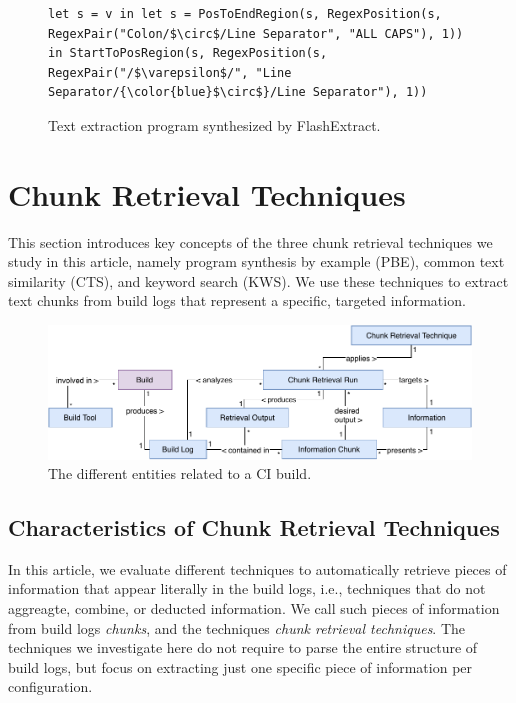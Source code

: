 \begin{figure}[!t]
  \centering
  \begin{lstlisting}[breaklines=true]
let s = v in let s = PosToEndRegion(s, RegexPosition(s, RegexPair("Colon/$\circ$/Line Separator", "ALL CAPS"), 1)) in StartToPosRegion(s, RegexPosition(s, RegexPair("/$\varepsilon$/", "Line Separator/{\color{blue}$\circ$}/Line Separator"), 1))
  \end{lstlisting}  
  \caption{Text extraction program synthesized by FlashExtract.}
  \label{lst:prose-program}
\end{figure}

\section{Chunk Retrieval Techniques}
\label{sec:techniques}
This section introduces key concepts of the three chunk retrieval techniques we study in this article, namely program synthesis by example (PBE), common text similarity (CTS), and keyword search (KWS).
We use these techniques to extract text chunks from build logs that represent a specific, targeted information.

\begin{figure}[!t]
	\centering
	\includegraphics[width=\columnwidth, clip]{img/build-overview.pdf}
	\caption{The different entities related to a CI build.
        }
	\label{fig:build-overview}
\end{figure}

\subsection{Characteristics of Chunk Retrieval Techniques}
\label{sec:blirt}
In this article, we evaluate different techniques to automatically retrieve pieces of information that appear literally in the build logs, i.e., techniques that do not aggreagte, combine, or deducted information. We call such pieces of information from build logs \emph{chunks}, and the techniques \emph{chunk retrieval techniques}.
The techniques we investigate here do not require to parse the entire structure of build logs, but focus on extracting just one specific piece of information per configuration.

